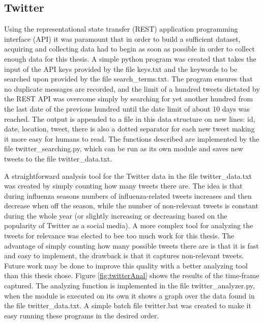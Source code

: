 \newpage\newpage







\subsection{Twitter}
Using the representational state transfer (REST) application programming interface (API) it was paramount that in order to build a sufficient dataset, acquiring and collecting data had to begin as soon as possible in order to collect enough data for this thesis. A simple python program was created that takes the input of the API keys provided by the file keys.txt and the keywords to be searched upon provided by the file search\_terms.txt. The program ensures that no duplicate messages are recorded, and the limit of a hundred tweets dictated by the REST API was overcome simply by searching for yet another hundred from the last date of the previous hundred until the date limit of about 10 days was reached.
The output is appended to a file in this data structure on new lines: id, date, location, tweet, there is also a dotted separator for each new tweet making it more easy for humans to read. The functions described are implemented by the file twitter\_searching.py, which can be run as its own module and saves new tweets to the file twitter\_data.txt.

A straightforward analysis tool for the Twitter data in the file twitter\_data.txt was created by simply counting how many tweets there are. The idea is that during influenza seasons numbers of influenza-related tweets increases and then decrease when off the season, while the number of non-relevant tweets is constant during the whole year (or slightly increasing or decreasing based on the popularity of Twitter as a social media). A more complex tool for analyzing the tweets for relevance was elected to bee too much work for this thesis. The advantage of simply counting how many possible tweets there are is that it is fast and easy to implement, the drawback is that it captures non-relevant tweets. Future work may be done to improve this quality with a better analyzing tool than this thesis chose. Figure \ref{fig:twitterAnal} shows the results of the time-frame captured. The analyzing function is implemented in the file twitter\_analyzer.py, when the module is executed on its own it shows a graph over the data found in the file twitter\_data.txt. A simple batch file twitter.bat was created to make it easy running these programs in the desired order.

